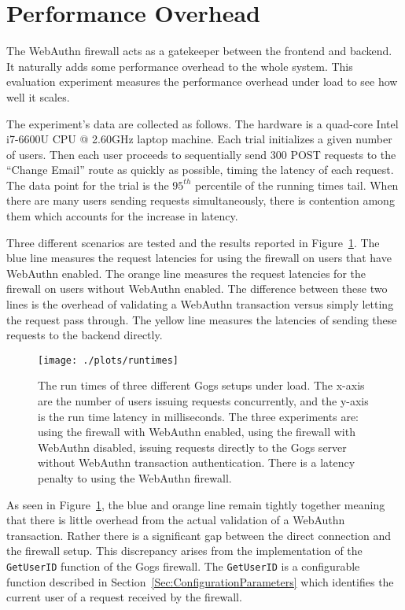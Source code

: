 \section{Performance Overhead}

The WebAuthn firewall acts as a gatekeeper between the frontend and backend. It naturally adds some performance overhead to the whole system. This evaluation experiment measures the performance overhead under load to see how well it scales. 

The experiment's data are collected as follows. The hardware is a quad-core Intel i7-6600U CPU @ 2.60GHz laptop machine. Each trial initializes a given number of users. Then each user proceeds to sequentially send 300 POST requests to the ``Change Email'' route as quickly as possible, timing the latency of each request. The data point for the trial is the $95^{th}$ percentile of the running times tail. When there are many users sending requests simultaneously, there is contention among them which accounts for the increase in latency.

Three different scenarios are tested and the results reported in Figure~\ref{Fig:PerformanceOverhead}. The blue line measures the request latencies for using the firewall on users that have WebAuthn enabled. The orange line measures the request latencies for the firewall on users without WebAuthn enabled. The difference between these two lines is the overhead of validating a WebAuthn transaction versus simply letting the request pass through. The yellow line measures the latencies of sending these requests to the backend directly.

\begin{figure}[h]
  \centering
  \texttt{[image: ./plots/runtimes]}
  \caption{The run times of three different Gogs setups under load. The x-axis are the number of users issuing requests concurrently, and the y-axis is the run time latency in milliseconds. The three experiments are: using the firewall with WebAuthn enabled, using the firewall with WebAuthn disabled, issuing requests directly to the Gogs server without WebAuthn transaction authentication. There is a latency penalty to using the WebAuthn firewall.}
  \label{Fig:PerformanceOverhead}
\end{figure}

As seen in Figure~\ref{Fig:PerformanceOverhead}, the blue and orange line remain tightly together meaning that there is little overhead from the actual validation of a WebAuthn transaction. Rather there is a significant gap between the direct connection and the firewall setup. This discrepancy arises from the implementation of the \lstinline{GetUserID} function of the Gogs firewall. The \lstinline{GetUserID} is a configurable function described in Section~\ref{Sec:ConfigurationParameters} which identifies the current user of a request received by the firewall. 

